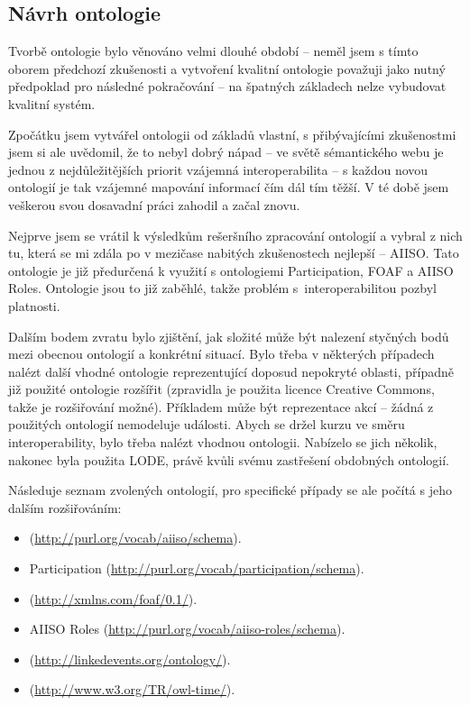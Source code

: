 \subsection{Návrh ontologie}
Tvorbě ontologie bylo věnováno velmi dlouhé období -- neměl jsem s tímto oborem předchozí zkušenosti a vytvoření kvalitní ontologie považuji jako nutný předpoklad pro následné pokračování -- na špatných základech nelze vybudovat kvalitní systém.

Zpočátku jsem vytvářel ontologii od základů vlastní, s přibývajícími zkušenostmi jsem si ale uvědomil, že to nebyl dobrý nápad -- ve světě sémantického webu je jednou z nejdůležitějších priorit vzájemná interoperabilita -- s každou novou ontologií je tak vzájemné mapování informací čím dál tím těžší. V té době jsem veškerou svou dosavadní práci zahodil a začal znovu.

Nejprve jsem se vrátil k výsledkům rešeršního zpracování ontologií a vybral z nich tu, která se mi zdála po v mezičase nabitých zkušenostech nejlepší -- \gls{AIISO}. Tato ontologie je již předurčená k využití s ontologiemi Participation, \gls{FOAF} a AIISO Roles. Ontologie jsou to již zaběhlé, takže problém s~interoperabilitou pozbyl platnosti.

Dalším bodem zvratu bylo zjištění, jak složité může být nalezení styčných bodů mezi obecnou ontologií a konkrétní situací. Bylo třeba v některých případech nalézt další vhodné ontologie reprezentující doposud nepokryté oblasti, případně již použité ontologie rozšířit (zpravidla je použita licence Creative Commons, takže je rozšiřování možné). Příkladem může být reprezentace akcí  -- žádná z použitých ontologií nemodeluje události. Abych se držel kurzu ve směru interoperability, bylo třeba nalézt vhodnou ontologii. Nabízelo se jich několik, nakonec byla použita \gls{LODE}, právě kvůli svému zastřešení obdobných ontologií.

Následuje seznam zvolených ontologií, pro specifické případy se ale počítá s jeho dalším rozšiřováním:
\begin{itemize}
 \item {} (\url{http://purl.org/vocab/aiiso/schema}).
 \item Participation (\url{http://purl.org/vocab/participation/schema}).
 \item {} (\url{http://xmlns.com/foaf/0.1/}).
 \item AIISO Roles (\url{http://purl.org/vocab/aiiso-roles/schema}).
 \item {} (\url{http://linkedevents.org/ontology/}).
 \item {} (\url{http://www.w3.org/TR/owl-time/}).
\end{itemize}


